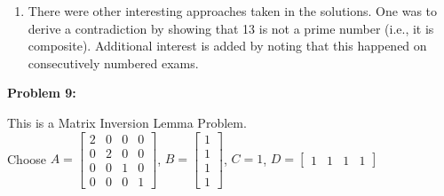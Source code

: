 \documentclass[letterpaper]{article}
\begin{document}
\begin{enumerate}
\item There were other interesting approaches taken in the solutions. One was to derive a contradiction by showing that 13 is not a prime number (i.e., it is composite). Additional interest is added by noting that this happened on consecutively numbered exams.

\end{enumerate}



%
%
%
%
%
%
%
%
%
%
%
%
%


\newpage



\noindent \textbf{Problem 9:}

This is a Matrix Inversion Lemma Problem. \\

Choose $A= \begin{bmatrix} 2 &0 & 0 & 0\\ 0 &  2& 0 & 0\\ 0 & 0 & 1 & 0\\ 0 & 0 & 0 & 1
\end{bmatrix}$, $B= \begin{bmatrix} 1 \\1 \\ 1 \\ 1\end{bmatrix}$, $C=1$, $D= \begin{bmatrix} 1 &1 & 1 & 1\end{bmatrix}$ \\
\end{document}
